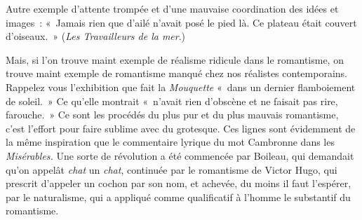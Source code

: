 \documentclass[french,twoside]{book} %
\begin{document}
{Autre exemple d’attente trompée et d’une mauvaise coordination des idées et images : « Jamais rien que d’ailé n’avait posé le pied là. Ce plateau était couvert d’oiseaux. » (\emph{Les Travailleurs de la mer}.)\par
Mais, si l’on trouve maint exemple de réalisme ridicule dans le romantisme, on trouve maint exemple de romantisme manqué chez nos réalistes contemporains. Rappelez vous l’exhibition que fait la \emph{Mouquette} « dans un dernier flamboiement de soleil. » Ce qu’elle montrait « n’avait rien d’obscène et ne faisait pas rire, farouche. » Ce sont les procédés du plus pur et du plus mauvais romantisme, c’est l’effort pour faire sublime avec du grotesque. Ces lignes sont évidemment de la même inspiration que le commentaire lyrique du mot Cambronne dans les {\itshape Misérables.} Une sorte de révolution a été commencée par Boileau, qui demandait qu’on appelât \emph{chat} un \emph{chat}, continuée par le romantisme de Victor Hugo, qui prescrit d’appeler un cochon par son nom, et achevée, du moins il faut l’espérer, par le naturalisme, qui a appliqué comme qualificatif à l’homme le substantif du romantisme.
}
\end{document}
